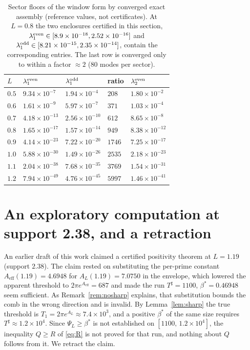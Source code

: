 ﻿\documentclass[11pt]{article}
\newcommand{\Tsharp}{T^{\sharp}}
\newcommand{\Aeff}{A_{\mathrm{eff}}}
\begin{document}
\begin{table}[ht]
\centering
\caption{Sector floors of the window form by converged exact assembly
(reference values, not certificates).  At $L=0.8$ the two enclosures
certified in this section,
$\lambda_1^{\rm even}\in[8.9\times10^{-18},2.52\times10^{-16}]$ and
$\lambda_1^{\rm odd}\in[8.21\times10^{-15},2.35\times10^{-14}]$,
contain the corresponding entries.  The last row is converged only to
within a factor $\approx2$ ($80$ modes per sector).}
\label{tab:parity}
\begin{tabular}{lllll}
\hline
$L$ & $\lambda_1^{\rm even}$ & $\lambda_1^{\rm odd}$ &
ratio & $\lambda_2^{\rm even}$ \\
\hline
$0.5$ & $9.34\times10^{-7}$  & $1.94\times10^{-4}$  & $208$  & $1.80\times10^{-2}$ \\
$0.6$ & $1.61\times10^{-9}$  & $5.97\times10^{-7}$  & $371$  & $1.03\times10^{-4}$ \\
$0.7$ & $4.18\times10^{-13}$ & $2.56\times10^{-10}$ & $612$  & $8.65\times10^{-8}$ \\
$0.8$ & $1.65\times10^{-17}$ & $1.57\times10^{-14}$ & $949$  & $8.38\times10^{-12}$ \\
$0.9$ & $4.14\times10^{-23}$ & $7.22\times10^{-20}$ & $1746$ & $7.25\times10^{-17}$ \\
$1.0$ & $5.88\times10^{-30}$ & $1.49\times10^{-26}$ & $2535$ & $2.18\times10^{-23}$ \\
$1.1$ & $2.04\times10^{-38}$ & $7.68\times10^{-35}$ & $3769$ & $1.54\times10^{-31}$ \\
$1.2$ & $7.94\times10^{-49}$ & $4.76\times10^{-45}$ & $5997$ & $1.46\times10^{-41}$ \\
\hline
\end{tabular}
\end{table}

\section{An exploratory computation at support 2.38, and a
retraction}\label{sec:L119}

An earlier draft of this work claimed a certified positivity theorem
at $L=1.19$ (support $2.38$).  The claim rested on substituting the
per-prime constant $\Aeff(1.19)=4.6948$ for $A_L(1.19)=7.0750$ in the
envelope, which lowered the apparent threshold to
$2\pi e^{\Aeff}=687$ and made the run $\Tsharp=1100$,
$\beta^*=0.46948$ seem sufficient.  As Remark~\ref{rem:nosharp}
explains, that substitution bounds the comb in the wrong direction and
is invalid.  By Lemma~\ref{lem:sharp} the true threshold is
$T_1=2\pi e^{A_L}\approx7.4\times10^3$, and a positive $\beta^*$ of
the same size requires $\Tsharp\approx1.2\times10^4$.  Since
$\Psi_L\ge\beta^*$ is not established on $[1100,\,1.2\times10^4]$, the
inequality $Q\ge R$ of \eqref{eq:R} is not proved for that run, and
nothing about $Q$ follows from it.  We retract the claim.
\end{document}
